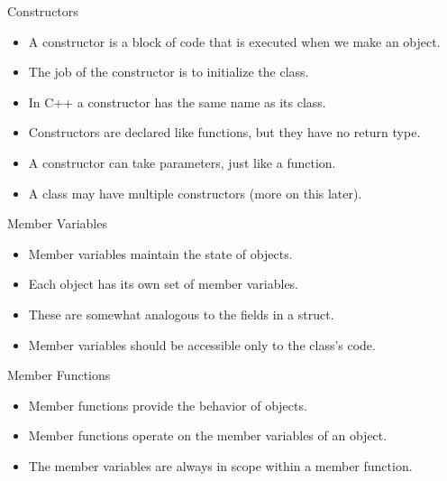 \documentclass[]{beamer}
\begin{document}
\begin{frame}{Constructors}
    \begin{itemize}[<+->]
        \item A constructor is a block of code that is executed when
            we make an object.
        \item The job of the constructor is to initialize the class.
        \item In C++ a constructor has the same name as its class.
        \item Constructors are declared like functions, but they have
            no return type.
        \item A constructor can take parameters, just like a function.
        \item A class may have multiple constructors (more on this
            later).
    \end{itemize}
\end{frame}

\begin{frame}{Member Variables}
    \begin{itemize}[<+->]
        \item Member variables maintain the state of objects.
        \item Each object has its own set of member variables.
        \item These are somewhat analogous to the fields in a struct.
        \item Member variables should be accessible only to the class's
            code.
    \end{itemize}
\end{frame}

\begin{frame}{Member Functions}
    \begin{itemize}[<+->]
        \item Member functions provide the behavior of objects.
        \item Member functions operate on the member variables of an
            object.
        \item The member variables are always in scope within a member
            function.
    \end{itemize}
\end{frame}
\end{document}
